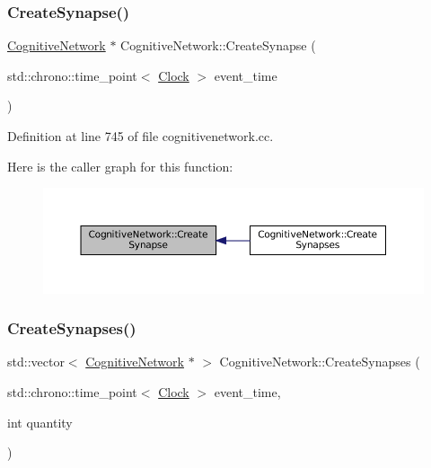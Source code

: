 \subsubsection{\texorpdfstring{Create\+Synapse()}{CreateSynapse()}}
{\footnotesize\ttfamily \mbox{\hyperlink{class_cognitive_network}{Cognitive\+Network}} $\ast$ Cognitive\+Network\+::\+Create\+Synapse (\begin{DoxyParamCaption}\item[{std\+::chrono\+::time\+\_\+point$<$ \mbox{\hyperlink{universe_8h_a0ef8d951d1ca5ab3cfaf7ab4c7a6fd80}{Clock}} $>$}]{event\+\_\+time }\end{DoxyParamCaption})}



Definition at line 745 of file cognitivenetwork.\+cc.

Here is the caller graph for this function\+:\nopagebreak
\begin{figure}[H]
\begin{center}
\leavevmode
\includegraphics[width=350pt]{class_cognitive_network_ade8e9295b35790b136dca9084a1b7aa9_icgraph}
\end{center}
\end{figure}
\mbox{\label{class_cognitive_network_ae6ae16f401e7699032ac9459132763c0}} 
\subsubsection{\texorpdfstring{Create\+Synapses()}{CreateSynapses()}}
{\footnotesize\ttfamily std\+::vector$<$ \mbox{\hyperlink{class_cognitive_network}{Cognitive\+Network}} $\ast$ $>$ Cognitive\+Network\+::\+Create\+Synapses (\begin{DoxyParamCaption}\item[{std\+::chrono\+::time\+\_\+point$<$ \mbox{\hyperlink{universe_8h_a0ef8d951d1ca5ab3cfaf7ab4c7a6fd80}{Clock}} $>$}]{event\+\_\+time,  }\item[{int}]{quantity }\end{DoxyParamCaption})}



